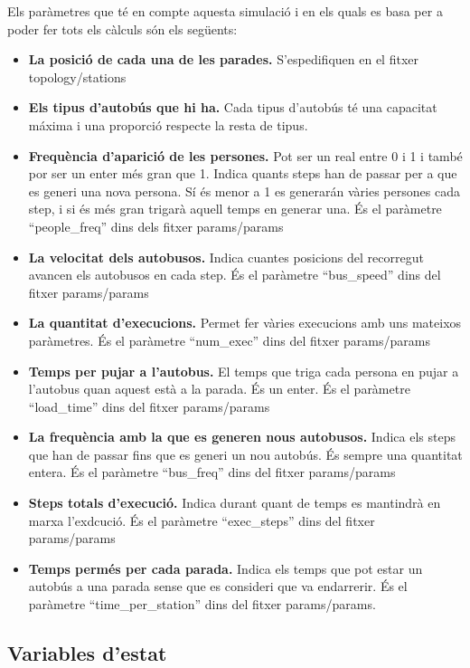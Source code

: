 \documentclass[a4paper,10pt]{article}
\begin{document}
Els paràmetres que té en compte aquesta simulació i en els quals es basa per a poder fer tots els càlculs són els següents:
\begin{itemize}
 \item \textbf{La posició de cada una de les parades.} S'espedifiquen en el fitxer topology/stations
 \item \textbf{Els tipus d'autobús que hi ha. } Cada tipus d'autobús té una capacitat máxima i una proporció respecte la resta de tipus.
 \item \textbf{Frequència d'aparició de les persones.} Pot ser un real entre 0 i 1 i també por ser un enter més gran que 1. Indica quants steps han de passar per a que es generi una nova persona. Sí és menor a 1 es generarán vàries persones cada step, i si és més gran trigarà aquell temps en generar una. És el paràmetre ``people\_freq'' dins dels fitxer params/params
 \item \textbf{La velocitat dels autobusos. } Indica cuantes posicions del recorregut avancen els autobusos en cada step. És el paràmetre ``bus\_speed'' dins del fitxer params/params
 \item \textbf{La quantitat d'execucions. } Permet fer vàries execucions amb uns mateixos paràmetres. És el paràmetre ``num\_exec'' dins del fitxer params/params
 \item \textbf{Temps per pujar a l'autobus. } El temps que triga cada persona en pujar a l'autobus quan aquest està a la parada. És un enter. És el paràmetre ``load\_time'' dins del fitxer params/params
 \item \textbf{La frequència amb la que es generen nous autobusos. } Indica els steps que han de passar fins que es generi un nou autobús. És sempre una quantitat entera. És el paràmetre ``bus\_freq'' dins del fitxer params/params
 \item \textbf{Steps totals d'execució. } Indica durant quant de temps es mantindrà en marxa l'exdcució. És el paràmetre ``exec\_steps'' dins del fitxer params/params
 \item \textbf{Temps permés per cada parada. } Indica els temps que pot estar un autobús a una parada sense que es consideri que va endarrerir. És el paràmetre ``time\_per\_station'' dins del fitxer params/params.
\end{itemize}

\subsection{Variables d'estat}
\end{document}
